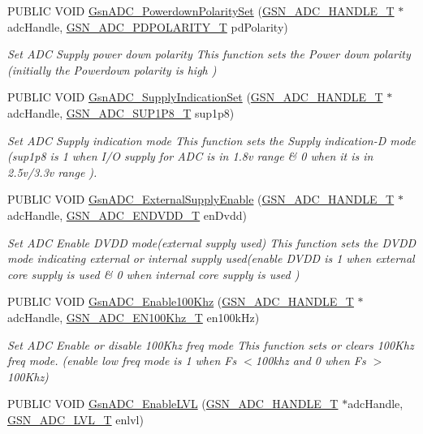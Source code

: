 \begin{DoxyCompactItemize}
PUBLIC VOID \hyperlink{a00643_gaecd2ed2c0404fbe7c9b5f698c8a98121}{GsnADC\_\-PowerdownPolaritySet} (\hyperlink{a00024}{GSN\_\-ADC\_\-HANDLE\_\-T} $\ast$adcHandle, \hyperlink{a00643_gadc237f56f621b5000b7ed2b2617ff364}{GSN\_\-ADC\_\-PDPOLARITY\_\-T} pdPolarity)
\begin{DoxyCompactList}\small\item\em Set ADC Supply power down polarity This function sets the Power down polarity (initially the Powerdown polarity is high ) \end{DoxyCompactList}\item 
PUBLIC VOID \hyperlink{a00643_ga8d0ddb6ead557188cc145cd7e4eec3a2}{GsnADC\_\-SupplyIndicationSet} (\hyperlink{a00024}{GSN\_\-ADC\_\-HANDLE\_\-T} $\ast$adcHandle, \hyperlink{a00643_ga79b5244aa923d094c80c37462b10dded}{GSN\_\-ADC\_\-SUP1P8\_\-T} sup1p8)
\begin{DoxyCompactList}\small\item\em Set ADC Supply indication mode This function sets the Supply indication-\/D mode (sup1p8 is 1 when I/O supply for ADC is in 1.8v range \& 0 when it is in 2.5v/3.3v range ). \end{DoxyCompactList}\item 
PUBLIC VOID \hyperlink{a00643_ga98cbb8990fd557a4ceb4fe7eb47760b6}{GsnADC\_\-ExternalSupplyEnable} (\hyperlink{a00024}{GSN\_\-ADC\_\-HANDLE\_\-T} $\ast$adcHandle, \hyperlink{a00643_ga704b8e4a05f99219d70f32cbf2fb4ca5}{GSN\_\-ADC\_\-ENDVDD\_\-T} enDvdd)
\begin{DoxyCompactList}\small\item\em Set ADC Enable DVDD mode(external supply used) This function sets the DVDD mode indicating external or internal supply used(enable DVDD is 1 when external core supply is used \& 0 when internal core supply is used ) \end{DoxyCompactList}\item 
PUBLIC VOID \hyperlink{a00643_ga18046da986a3d13cb32ac35e7b0b08a5}{GsnADC\_\-Enable100Khz} (\hyperlink{a00024}{GSN\_\-ADC\_\-HANDLE\_\-T} $\ast$adcHandle, \hyperlink{a00643_gacdca24ad9324635589139ad12ce67090}{GSN\_\-ADC\_\-EN100Khz\_\-T} en100kHz)
\begin{DoxyCompactList}\small\item\em Set ADC Enable or disable 100Khz freq mode This function sets or clears 100Khz freq mode. (enable low freq mode is 1 when Fs $<$100khz and 0 when Fs $>$100Khz) \end{DoxyCompactList}\item 
PUBLIC VOID \hyperlink{a00643_ga7f7da5a1332ee93571a95c3134eb11cf}{GsnADC\_\-EnableLVL} (\hyperlink{a00024}{GSN\_\-ADC\_\-HANDLE\_\-T} $\ast$adcHandle, \hyperlink{a00643_ga5a94fb4298f40809bab65da9dd446da7}{GSN\_\-ADC\_\-LVL\_\-T} enlvl)

\end{DoxyCompactItemize}
